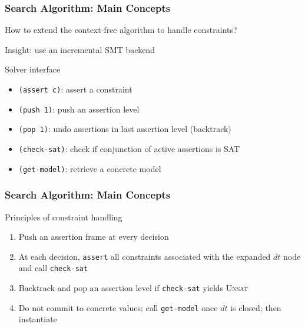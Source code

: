\documentclass[11pt,xcolor={dvipsnames},hyperref={pdftex,pdfpagemode=UseNone,hidelinks,pdfdisplaydoctitle=true},usepdftitle=false]{beamer}
\newcommand{\green}[1]{\textcolor{green!60!black}{#1}}
\newcommand{\blue}[1]{\textcolor{blue!70!black}{#1}}
\begin{document}
\begin{frame} \frametitle{Search Algorithm: Main Concepts}
    How to extend the context-free algorithm to handle constraints?\\[4pt]\pause
    
    Insight: use an \green{incremental SMT} backend\\[4pt]\pause

    Solver interface\pause
    \begin{itemize} 
      \item {\scriptsize\blue{\texttt{(assert c)}}}: assert a constraint\pause
      \item {\scriptsize\blue{\texttt{(push 1)}}}: push an assertion level\pause
      \item {\scriptsize\blue{\texttt{(pop 1)}}}: undo assertions in last assertion level (backtrack)\pause
      \item {\scriptsize\blue{\texttt{(check-sat)}}}: check if conjunction of active assertions is \blue{\textsc{SAT}}\pause
      \item {\scriptsize\blue{\texttt{(get-model)}}}: retrieve a concrete model
    \end{itemize}
\end{frame}

\begin{frame} \frametitle{Search Algorithm: Main Concepts}
    Principles of constraint handling\pause

    \vspace{-4pt}
     \pause 
    \begin{enumerate}
      \item Push an assertion frame at every decision\pause
      \item At each decision, {\scriptsize\blue{\texttt{assert}}} all constraints associated with the expanded \blue{$dt$} node and call {\scriptsize\blue{\texttt{check-sat}}}\pause
      \item Backtrack and pop an assertion level if {\scriptsize\blue{\texttt{check-sat}}} yields \blue{\textsc{Unsat}}\pause
      \item Do not commit to concrete values; call {\scriptsize\blue{\texttt{get-model}}} once \blue{$dt$} is closed; then instantiate
    \end{enumerate}
\end{frame}
\end{document}
